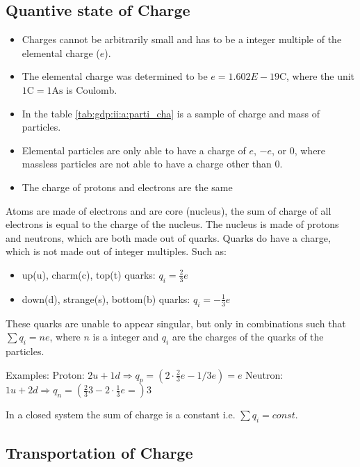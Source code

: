 \subsection{Quantive state of Charge}

\begin{itemize}
    \item Charges cannot be arbitrarily small 
    and has to be a integer multiple of the elemental charge ($e$).

    \item The elemental charge was determined to be $e = 1.602E-19 \text{C}$,
    where the unit $1 \text{C} = 1 \text{As}$ is Coulomb.

    \item In the table \ref{tab:gdp:ii:a:parti_cha} is a sample of charge and mass of particles.

    \item Elemental particles are only able to have a charge of $e$, $-e$, or $0$,
    where massless particles are not able to have a charge other than $0$.
    \item The charge of protons and electrons are the same

\end{itemize}


Atoms are made of electrons and are core (nucleus),
    the sum of charge of all electrons is equal to the charge of the nucleus.
The nucleus is made of protons and neutrons, 
    which are both made out of quarks.
Quarks do have a charge, 
    which is not made out of integer multiples.
Such as: 
\begin{itemize}
    \item up(u), charm(c), top(t) quarks: $q_i = \frac{2}{3}e$
    \item down(d), strange(s), bottom(b) quarks: $q_i = -\frac{1}{3}e$
\end{itemize}

These quarks are unable to appear singular,
    but only in combinations such that $\sum q_{i} = n e$,
    where $n$ is a integer and $q_i$ are the charges of the quarks of the particles.

Examples:
Proton: $2 u + 1 d \Rightarrow q_p = \left( 2\cdot \frac{2}{3} e - 1/3 e\right)= e$
Neutron: $1 u + 2d \Rightarrow q_n = \left(\frac{2}{3}3-2\cdot\frac{1}{3}e = \right)3$

In a closed system the sum of charge is a constant i.e. $\sum q_i = const.$

\subsection{Transportation of Charge}

